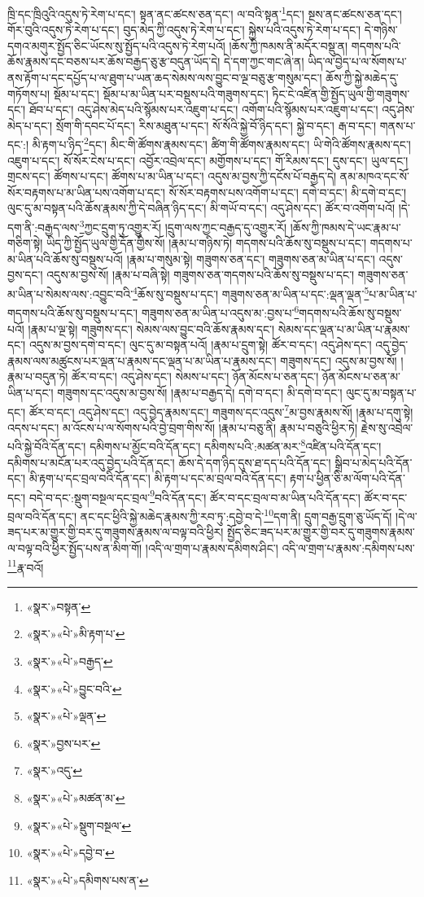 ཁྲི་དང་ཁྲིའུའི་འདུས་ཏེ་རེག་པ་དང་། སྟན་ནང་ཚངས་ཅན་དང་། ལ་བའི་སྟན་\footnote{«སྣར་»བསྟན་}དང་། སྔས་ནང་ཚངས་ཅན་དང་། གོར་བུའི་འདུས་ཏེ་རེག་པ་དང་། བུད་མེད་ཀྱི་འདུས་ཏེ་རེག་པ་དང་། སྐྱེས་པའི་འདུས་ཏེ་རེག་པ་དང་། དེ་གཉིས་དགའ་མགུར་སྤྱོད་ཅིང་ཡོངས་སུ་སྤྱོད་པའི་འདུས་ཏེ་རེག་པའོ། །ཆོས་ཀྱི་ཁམས་ནི་མདོར་བསྡུ་ན། གདགས་པའི་ཆོས་རྣམས་དང་བཅས་པར་ཆོས་བརྒྱད་ཅུ་རྩ་བདུན་ཡོད་དེ། དེ་དག་ཀྱང་གང་ཞེ་ན། ཡིད་ལ་བྱེད་པ་ལ་སོགས་པ་ནས་རྟོག་པ་དང་དཔྱོད་པ་ལ་ཐུག་པ་ཡན་ཆད་སེམས་ལས་བྱུང་བ་ལྔ་བཅུ་རྩ་གསུམ་དང་། ཆོས་ཀྱི་སྐྱེ་མཆེད་དུ་གཏོགས་པ། སྡོམ་པ་དང་། སྡོམ་པ་མ་ཡིན་པར་བསྡུས་པའི་གཟུགས་དང་། ཏིང་ངེ་འཛིན་གྱི་སྤྱོད་ཡུལ་གྱི་གཟུགས་དང་། ཐོབ་པ་དང་། འདུ་ཤེས་མེད་པའི་སྙོམས་པར་འཇུག་པ་དང་། འགོག་པའི་སྙོམས་པར་འཇུག་པ་དང་། འདུ་ཤེས་མེད་པ་དང་། སྲོག་གི་དབང་པོ་དང་། རིས་མཐུན་པ་དང་། སོ་སོའི་སྐྱེ་བོ་ཉིད་དང་། སྐྱེ་བ་དང་། རྒ་བ་དང་། གནས་པ་དང་:། མི་རྟག་པ་ཉིད་\footnote{«སྣར་»«པེ་»མི་རྟག་པ་}དང་། མིང་གི་ཚོགས་རྣམས་དང་། ཚིག་གི་ཚོགས་རྣམས་དང་། ཡི་གེའི་ཚོགས་རྣམས་དང་། འཇུག་པ་དང་། སོ་སོར་ངེས་པ་དང་། འབྱོར་འབྲེལ་དང་། མགྱོགས་པ་དང་། གོ་རིམས་དང་། དུས་དང་། ཡུལ་དང་། གྲངས་དང་། ཚོགས་པ་དང་། ཚོགས་པ་མ་ཡིན་པ་དང་། འདུས་མ་བྱས་ཀྱི་དངོས་པོ་བརྒྱད་དེ། ནམ་མཁའ་དང་སོ་སོར་བརྟགས་པ་མ་ཡིན་པས་འགོག་པ་དང་། སོ་སོར་བརྟགས་པས་འགོག་པ་དང་། དགེ་བ་དང་། མི་དགེ་བ་དང་། ལུང་དུ་མ་བསྟན་པའི་ཆོས་རྣམས་ཀྱི་དེ་བཞིན་ཉིད་དང་། མི་གཡོ་བ་དང་། འདུ་ཤེས་དང་། ཚོར་བ་འགོག་པའོ། །དེ་དག་ནི་:བརྒྱད་ལས་\footnote{«སྣར་»«པེ་»བརྒྱད་}ཀྱང་དྲུག་ཏུ་འགྱུར་རོ། །དྲུག་ལས་ཀྱང་བརྒྱད་དུ་འགྱུར་རོ། །ཆོས་ཀྱི་ཁམས་དེ་ཡང་རྣམ་པ་གཅིག་སྟེ། ཡིད་ཀྱི་སྤྱོད་ཡུལ་གྱི་དོན་གྱིས་སོ། །རྣམ་པ་གཉིས་ཏེ། གདགས་པའི་ཆོས་སུ་བསྡུས་པ་དང་། གདགས་པ་མ་ཡིན་པའི་ཆོས་སུ་བསྡུས་པའོ། །རྣམ་པ་གསུམ་སྟེ། གཟུགས་ཅན་དང་། གཟུགས་ཅན་མ་ཡིན་པ་དང་། འདུས་བྱས་དང་། འདུས་མ་བྱས་སོ། །རྣམ་པ་བཞི་སྟེ། གཟུགས་ཅན་གདགས་པའི་ཆོས་སུ་བསྡུས་པ་དང་། གཟུགས་ཅན་མ་ཡིན་པ་སེམས་ལས་:འབྱུང་བའི་\footnote{«སྣར་»«པེ་»བྱུང་བའི་}ཆོས་སུ་བསྡུས་པ་དང་། གཟུགས་ཅན་མ་ཡིན་པ་དང་:ལྡན་ལྡན་\footnote{«སྣར་»«པེ་»ལྡན་}པ་མ་ཡིན་པ་གདགས་པའི་ཆོས་སུ་བསྡུས་པ་དང་། གཟུགས་ཅན་མ་ཡིན་པ་འདུས་མ་:བྱས་པ་\footnote{«སྣར་»བྱས་པར་}གདགས་པའི་ཆོས་སུ་བསྡུས་པའོ། །རྣམ་པ་ལྔ་སྟེ། གཟུགས་དང་། སེམས་ལས་བྱུང་བའི་ཆོས་རྣམས་དང་། སེམས་དང་ལྡན་པ་མ་ཡིན་པ་རྣམས་དང་། འདུས་མ་བྱས་དགེ་བ་དང་། ལུང་དུ་མ་བསྟན་པའོ། །རྣམ་པ་དྲུག་སྟེ། ཚོར་བ་དང་། འདུ་ཤེས་དང་། འདུ་བྱེད་རྣམས་ལས་མཚུངས་པར་ལྡན་པ་རྣམས་དང་ལྡན་པ་མ་ཡིན་པ་རྣམས་དང་། གཟུགས་དང་། འདུས་མ་བྱས་སོ། །རྣམ་པ་བདུན་ཏེ། ཚོར་བ་དང་། འདུ་ཤེས་དང་། སེམས་པ་དང་། ཉོན་མོངས་པ་ཅན་དང་། ཉོན་མོངས་པ་ཅན་མ་ཡིན་པ་དང་། གཟུགས་དང་འདུས་མ་བྱས་སོ། །རྣམ་པ་བརྒྱད་དེ། དགེ་བ་དང་། མི་དགེ་བ་དང་། ལུང་དུ་མ་བསྟན་པ་དང་། ཚོར་བ་དང་། འདུ་ཤེས་དང་། འདུ་བྱེད་རྣམས་དང་། གཟུགས་དང་འདུས་\footnote{«སྣར་»འདུ་}མ་བྱས་རྣམས་སོ། །རྣམ་པ་དགུ་སྟེ། འདས་པ་དང་། མ་འོངས་པ་ལ་སོགས་པའི་བྱེ་བྲག་གིས་སོ། །རྣམ་པ་བཅུ་ནི། རྣམ་པ་བཅུའི་ཕྱིར་ཏེ། རྗེས་སུ་འབྲེལ་པའི་སྐྱེ་བོའི་དོན་དང་། དམིགས་པ་མྱོང་བའི་དོན་དང་། དམིགས་པའི་:མཚན་མར་\footnote{«སྣར་»«པེ་»མཚན་མ་}འཛིན་པའི་དོན་དང་། དམིགས་པ་མངོན་པར་འདུ་བྱེད་པའི་དོན་དང་། ཆོས་དེ་དག་ཉིད་དུས་ཐ་དད་པའི་དོན་དང་། སྒྲིབ་པ་མེད་པའི་དོན་དང་། མི་རྟག་པ་དང་བྲལ་བའི་དོན་དང་། མི་རྟག་པ་དང་མ་བྲལ་བའི་དོན་དང་། རྟག་པ་ཕྱིན་ཅི་མ་ལོག་པའི་དོན་དང་། བདེ་བ་དང་:སྡུག་བསྔལ་དང་བྲལ་\footnote{«སྣར་»«པེ་»སྡུག་བསྔལ་}བའི་དོན་དང་། ཚོར་བ་དང་བྲལ་བ་མ་ཡིན་པའི་དོན་དང་། ཚོར་བ་དང་བྲལ་བའི་དོན་དང་། ནང་དང་ཕྱིའི་སྐྱེ་མཆེད་རྣམས་ཀྱི་རབ་ཏུ་:དབྱེ་བ་དེ་\footnote{«སྣར་»«པེ་»དབྱེ་བ་}དག་ནི། དྲུག་བརྒྱ་དྲུག་ཅུ་ཡོད་དོ། །དེ་ལ་ཟད་པར་མ་གྱུར་གྱི་བར་དུ་གཟུགས་རྣམས་ལ་བལྟ་བའི་ཕྱིར། སྤྱོད་ཅིང་ཟད་པར་མ་གྱུར་གྱི་བར་དུ་གཟུགས་རྣམས་ལ་བལྟ་བའི་ཕྱིར་སྤྱོད་པས་ན་མིག་གོ། །འདི་ལ་གྲག་པ་རྣམས་དམིགས་ཤིང་། འདི་ལ་གྲག་པ་རྣམས་:དམིགས་པས་\footnote{«སྣར་»«པེ་»དམིགས་པས་ན་}རྣ་བའོ། 
